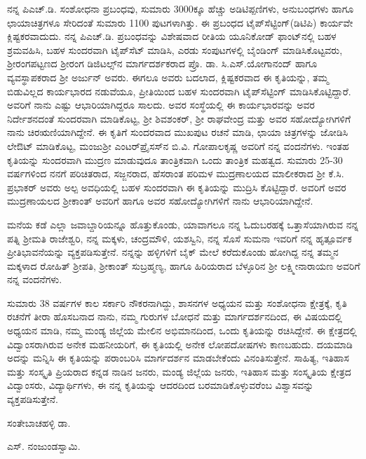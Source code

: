 ನನ್ನ ಪಿಎಚ್​.ಡಿ. ಸಂಶೋಧನಾ ಪ್ರಬಂಧವು, ಸುಮಾರು 3000ಕ್ಕೂ ಹೆಚ್ಚು ಅಡಿಟಿಪ್ಪಣಿಗಳು, ಅನುಬಂಧಗಳು ಹಾಗೂ ಛಾಯಾಚಿತ್ರಗಳೂ ಸೇರಿದಂತೆ ಸುಮಾರು 1100 ಪುಟಗಳಾಗಿತ್ತು. ಈ ಪ್ರಬಂಧದ ಟೈಪ್​ಸೆಟ್ಟಿಂಗ್​(ಡಿಟಿಪಿ) ಕಾರ್ಯವೇ ಕ್ಲಿಷ್ಟಕರವಾದುದು. ನನ್ನ ಪಿಎಚ್​.ಡಿ. ಪ್ರಬಂಧವನ್ನು ವಿಶೇಷವಾದ ರೀತಿಯ ಯೂನಿಕೋಡ್​ ಫಾಂಟ್​ನಲ್ಲಿ ಬಹಳ ಶ್ರಮವಹಿಸಿ, ಬಹಳ ಸುಂದರವಾಗಿ ಟೈಪ್​ಸೆಟ್​ ಮಾಡಿಸಿ, ಎರಡು ಸಂಪುಟಗಳಲ್ಲಿ ಬೈಂಡಿಂಗ್​ ಮಾಡಿಸಿಕೊಟ್ಟವರು, ಶ‍್ರೀರಂಗಪಟ್ಟಣದ ಶ‍್ರೀರಂಗ ಡಿಜಿಟಲ್ಸ್​ನ ಮಾರ್ಗದರ್ಶಕರಾದ ಪ್ರೊ. ಡಾ. ಸಿ.ಎಸ್​.ಯೋಗಾನಂದ್​ ಹಾಗೂ ವ್ಯವಸ್ಥಾಪಕರಾದ ಶ‍್ರೀ ಅರ್ಜುನ್​ ಅವರು. ಈಗಲೂ ಅವರು ಬದಲಾದ, ಕ್ಲಿಷ್ಟಕರವಾದ ಈ ಕೃತಿಯನ್ನು, ತಮ್ಮ ಬಿಡುವಿಲ್ಲದ ಕಾರ್ಯಭಾರದ ನಡುವೆಯೂ, ಪ್ರೀತಿಯಿಂದ ಬಹಳ ಸುಂದರವಾಗಿ ಟೈಪ್​ಸೆಟ್ಟಿಂಗ್​ ಮಾಡಿಸಿಕೊಟ್ಟಿದ್ದಾರೆ. ಅವರಿಗೆ ನಾನು ಎಷ್ಟು ಆಭಾರಿಯಾಗಿದ್ದರೂ ಸಾಲದು. ಅವರ ಸಂಸ್ಥೆಯಲ್ಲಿ ಈ ಕಾರ್ಯಭಾರವನ್ನು ಅವರ ನಿರ್ದೇಶನದಂತೆ ಸುಂದರವಾಗಿ ಮಾಡಿಕೊಟ್ಟ, ಶ‍್ರೀ ಶಿವಶಂಕರ್​, ಶ‍್ರೀ ರಾಘವೇಂದ್ರ ಮತ್ತು ಅವರ ಸಹೋದ್ಯೋಗಿಗಳಿಗೆ ನಾನು ಚಿರಋಣಿಯಾಗಿದ್ದೇನೆ. ಈ ಕೃತಿಗೆ ಸುಂದರವಾದ ಮುಖಪುಟ ರಚನೆ ಮಾಡಿ, ಛಾಯಾ ಚಿತ್ರಗಳನ್ನು ಜೋಡಿಸಿ ಲೇಔಟ್​ ಮಾಡಿಕೊಟ್ಟ, ಮಂಜುಶ‍್ರೀ ಎಂಟರ್​ಪ್ರೈಸಸ್​ನ ಬಿ.ವಿ. ಗೋಪಾಲಕೃಷ್ಣ ಅವರಿಗೆ ನನ್ನ ವಂದನೆಗಳು. ಇಂತಹ ಕೃತಿಯನ್ನು ಸುಂದರವಾಗಿ ಮುದ್ರಣ ಮಾಡುವುದೂ ತಾಂತ್ರಿಕವಾಗಿ ಒಂದು ತಾಂತ್ರಿಕ ಮಹತ್ವದ. ಸುಮಾರು 25-30 ವರ್ಷಗಳಿಂದ ನನಗೆ ಪರಿಚಿತರಾದ, ಸಜ್ಜನರಾದ, ಹೆಸರಾಂತ ಪರಿಮಳ ಮುದ್ರಣಾಲಯದ ಮಾಲೀಕರಾದ ಶ‍್ರೀ ಕೆ.ಸಿ. ಪ್ರಭಾಕರ್​ ಅವರು ಅಲ್ಪ ಅವಧಿಯಲ್ಲಿ ಬಹಳ ಸುಂದರವಾಗಿ ಈ ಕೃತಿಯನ್ನು ಮುದ್ರಿಸಿ ಕೊಟ್ಟಿದ್ದಾರೆ. ಅವರಿಗೆ ಅವರ ಮುದ್ರಣಾಯಲದ ಶ‍್ರೀಕಾಂತ್​ ಅವರಿಗೆ ಹಾಗೂ ಅವರ ಸಹೋದ್ಯೋಗಿಗಳಿಗೆ ನಾನು ಆಭಾರಿಯಾಗಿದ್ದೇನೆ.

ಮನೆಯ ಕಡೆ ಎಲ್ಲಾ ಜವಾಬ್ದಾರಿಯನ್ನೂ ಹೊತ್ತುಕೊಂಡು, ಯಾವಾಗಲೂ ನನ್ನ ಓದುಬರಹಕ್ಕೆ ಒತ್ತಾಸೆಯಾಗಿರುವ ನನ್ನ ಪತ್ನಿ ಶ‍್ರೀಮತಿ ರಾಜೇಶ್ವರಿ, ನನ್ನ ಮಕ್ಕಳು, ಚಂದ್ರಮೌಳಿ, ಯಶಸ್ವಿನಿ, ನನ್ನ ಸೊಸೆ ಸುಮನಾ ಇವರಿಗೆ ನನ್ನ ಹೃತ್ಪೂರ್ವಕ ಪ್ರೀತಿಭಾವನೆಯನ್ನು ವ್ಯಕ್ತಪಡಿಸುತ್ತೇನೆ. ನನ್ನನ್ನು ಹಳ್ಳಿಗಳಿಗೆ ಬೈಕ್​ ಮೇಲೆ ಕರೆದುಕೊಂಡು ಹೋಗಿದ್ದ ನನ್ನ ತಮ್ಮನ ಮಕ್ಕಳಾದ ರೋಹಿತ್​ ಶ‍್ರೀಪತಿ, ಶ‍್ರೀಕಾಂತ್​ ಸುಬ್ರಹ್ಮಣ್ಯ, ಹಾಗೂ ಹಿರಿಯರಾದ ಬೆಳ್ಳೂರಿನ ಶ‍್ರೀ ಲಕ್ಷ್ಮೀನಾರಾಯಣ ಅವರಿಗೆ ನನ್ನ ವಂದನೆಗಳು.

ಸುಮಾರು 38 ವರ್ಷಗಳ ಕಾಲ ಸರ್ಕಾರಿ ನೌಕರನಾಗಿದ್ದು, ಶಾಸನಗಳ ಅಧ್ಯಯನ ಮತ್ತು ಸಂಶೋಧನಾ ಕ್ಷೇತ್ರಕ್ಕೆ, ಕೃತಿ ರಚನೆಗೆ ತೀರಾ ಹೊಸಬನಾದ ನಾನು, ನಮ್ಮ ಗುರುಗಳ ಬೋಧನೆ ಮತ್ತು ಮಾರ್ಗದರ್ಶನದಿಂದ, ಈ ವಿಷಯದಲ್ಲಿ ಅಧ್ಯಯನ ಮಾಡಿ, ನಮ್ಮ ಮಂಡ್ಯ ಜಿಲ್ಲೆಯ ಮೇಲಿನ ಅಭಿಮಾನದಿಂದ, ಒಂದು ಕೃತಿಯನ್ನು ರಚಿಸಿದ್ದೇನೆ. ಈ ಕ್ಷೇತ್ರದಲ್ಲಿ ವಿದ್ವಾಂಸರಾಗಿರುವ ಅನೇಕ ಮಹನೀಯರಿಗೆ, ಈ ಕೃತಿಯಲ್ಲಿ ಅನೇಕ ಲೋಪದೋಷಗಳು ಕಾಣಬಹುದು. ದಯಮಾಡಿ ಅದನ್ನು ಮನ್ನಿಸಿ ಈ ಕೃತಿಯನ್ನು ಪರಾಂಬರಿಸಿ ಮಾರ್ಗದರ್ಶನ ಮಾಡಬೇಕೆಂದು ವಿನಂತಿಸುತ್ತೇನೆ. ಸಾಹಿತ್ಯ, ಇತಿಹಾಸ ಮತ್ತು ಸಂಸ್ಕೃತಿ ಪ್ರಿಯರಾದ ಕನ್ನಡ ನಾಡಿನ ಜನರು, ಮಂಡ್ಯ ಜಿಲ್ಲೆಯ ಜನರು, ಇತಿಹಾಸ ಮತ್ತು ಸಂಸ್ಕೃತಿಯ ಕ್ಷೇತ್ರದ ವಿದ್ವಾಂಸರು, ವಿದ್ಯಾರ್ಥಿಗಳು, ಈ ನನ್ನ ಕೃತಿಯನ್ನು ಆದರದಿಂದ ಬರಮಾಡಿಕೊಳ್ಳುವರೆಂಬ ವಿಶ್ವಾಸವನ್ನು ವ್ಯಕ್ತಪಡಿಸುತ್ತೇನೆ.

\begin{flushright}
ಸಂತೇಬಾಚಹಳ್ಳಿ ಡಾ.
\end{flushright}

ಎಸ್​. ನಂಜುಂಡಸ್ವಾಮಿ.

